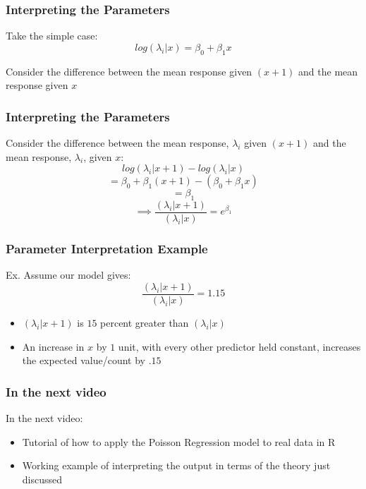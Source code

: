 \documentclass{beamer}
\begin{document}
\begin{frame}[fragile]\frametitle{Interpreting the Parameters}	
	
	Take the simple case: $$ log(\lambda_i|x) = \beta_0 + \beta_1 x $$

	Consider the difference between the mean response given $(x+1)$ and the mean response given $x$
	
\end{frame}



\begin{frame}[fragile]\frametitle{Interpreting the Parameters}
	Consider the difference between the mean response, $\lambda_i$ given $(x+1)$ and the mean response, $\lambda_i$, given $x$:
	$$ log(\lambda_i|x+1) - log(\lambda_i|x) $$
	$$ = \beta_0 + \beta_1 (x + 1) - (\beta_0 + \beta_1 x)$$ 
	$$ = \beta_1 $$
	$$ \implies \frac{(\lambda_i|x+1)}{(\lambda_i|x)} = e^{\beta_1} $$
\end{frame}



\begin{frame}[fragile]\frametitle{Parameter Interpretation Example}
	
	Ex. Assume our model gives: $$ \frac{(\lambda_i|x+1)}{(\lambda_i|x)} = 1.15 $$
	
	\begin{itemize}
	
		\item $(\lambda_i|x+1)$ is $15$ percent greater than $(\lambda_i|x)$
		
		\item An increase in $x$ by $1$ unit, with every other predictor held constant, increases the expected value/count by $.15$
	
	\end{itemize}
	
\end{frame}



\begin{frame}[fragile]\frametitle{In the next video}
	
	In the next video:	
	
	\begin{itemize}
	
		\item Tutorial of how to apply the Poisson Regression model to real data in R
		
		\item Working example of interpreting the output in terms of the theory just discussed
		
	\end{itemize}
	
\end{frame}
\end{document}
